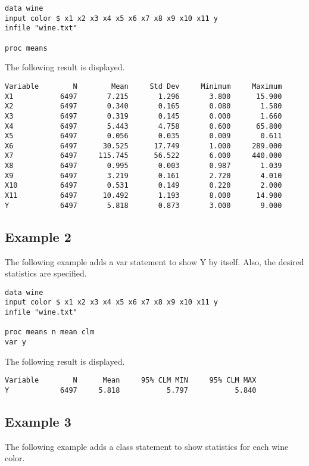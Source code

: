 \documentclass[12pt]{article}
\begin{document}
\begin{Verbatim}
data wine
input color $ x1 x2 x3 x4 x5 x6 x7 x8 x9 x10 x11 y
infile "wine.txt"

proc means
\end{Verbatim}

The following result is displayed.

\begin{Verbatim}
Variable        N        Mean     Std Dev     Minimum     Maximum
X1           6497       7.215       1.296       3.800      15.900
X2           6497       0.340       0.165       0.080       1.580
X3           6497       0.319       0.145       0.000       1.660
X4           6497       5.443       4.758       0.600      65.800
X5           6497       0.056       0.035       0.009       0.611
X6           6497      30.525      17.749       1.000     289.000
X7           6497     115.745      56.522       6.000     440.000
X8           6497       0.995       0.003       0.987       1.039
X9           6497       3.219       0.161       2.720       4.010
X10          6497       0.531       0.149       0.220       2.000
X11          6497      10.492       1.193       8.000      14.900
Y            6497       5.818       0.873       3.000       9.000
\end{Verbatim}

\subsection*{Example 2}
The following example adds a var statement to show Y by itself.
Also, the desired statistics are specified.

\begin{Verbatim}
data wine
input color $ x1 x2 x3 x4 x5 x6 x7 x8 x9 x10 x11 y
infile "wine.txt"

proc means n mean clm
var y
\end{Verbatim}

The following result is displayed.

\begin{Verbatim}
Variable        N      Mean     95% CLM MIN     95% CLM MAX
Y            6497     5.818           5.797           5.840
\end{Verbatim}

\subsection*{Example 3}
The following example adds a class statement
to show statistics for each wine color.
\end{document}

